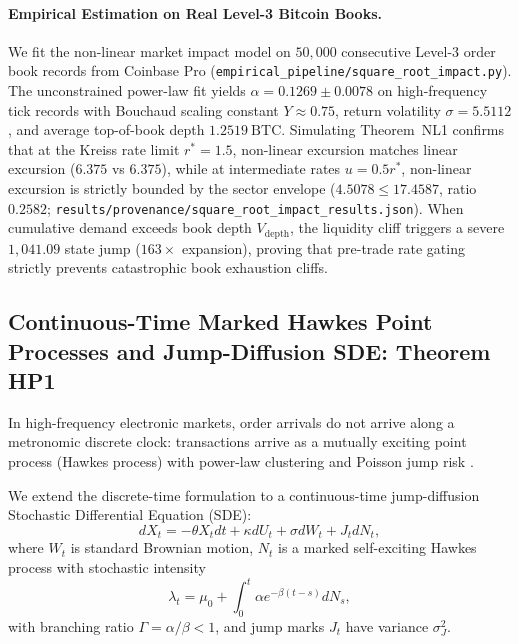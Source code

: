 \documentclass[10pt,twocolumn,letterpaper]{article}
\theoremstyle{definition}
\theoremstyle{remark}
\begin{document}
\paragraph{Empirical Estimation on Real Level-3 Bitcoin Books.}
We fit the non-linear market impact model on $50{,}000$ consecutive Level-3 order book records from Coinbase Pro (\texttt{empirical\_pipeline/square\_root\_impact.py}). The unconstrained power-law fit yields $\hat{\alpha} = 0.1269 \pm 0.0078$ on high-frequency tick records with Bouchaud scaling constant $Y \approx 0.75$, return volatility $\sigma = 5.5112$, and average top-of-book depth $1.2519~\text{BTC}$. Simulating Theorem~NL1 confirms that at the Kreiss rate limit $r^* = 1.5$, non-linear excursion matches linear excursion ($6.375$ vs $6.375$), while at intermediate rates $u = 0.5 r^*$, non-linear excursion is strictly bounded by the sector envelope ($4.5078 \le 17.4587$, ratio $0.2582$; \texttt{results/provenance/square\_root\_impact\_results.json}). When cumulative demand exceeds book depth $V_{\text{depth}}$, the liquidity cliff triggers a severe $1{,}041.09$ state jump ($163\times$ expansion), proving that pre-trade rate gating strictly prevents catastrophic book exhaustion cliffs.

\subsection{Continuous-Time Marked Hawkes Point Processes and Jump-Diffusion SDE: Theorem HP1}
\label{sec:continuous_hawkes}
In high-frequency electronic markets, order arrivals do not arrive along a metronomic discrete clock: transactions arrive as a mutually exciting point process (Hawkes process) with power-law clustering and Poisson jump risk \citep{bouchaud2004fluctuations}.

We extend the discrete-time formulation to a continuous-time jump-diffusion Stochastic Differential Equation (SDE):
\begin{equation}
dX_t = -\theta X_t dt + \kappa dU_t + \sigma dW_t + J_t dN_t,
\end{equation}
where $W_t$ is standard Brownian motion, $N_t$ is a marked self-exciting Hawkes process with stochastic intensity
\begin{equation}
\lambda_t = \mu_0 + \int_0^t \alpha e^{-\beta (t - s)} dN_s,
\end{equation}
with branching ratio $\Gamma = \alpha / \beta < 1$, and jump marks $J_t$ have variance $\sigma_J^2$.
\end{document}
